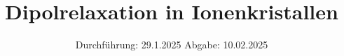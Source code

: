 

\subject{V48}
\title{Dipolrelaxation in Ionenkristallen}
\date{%
  Durchführung: 29.1.2025
  \hspace{3em}
  Abgabe: 10.02.2025
}



\maketitle
\thispagestyle{empty}
\tableofcontents
\newpage








\printbibliography{}


